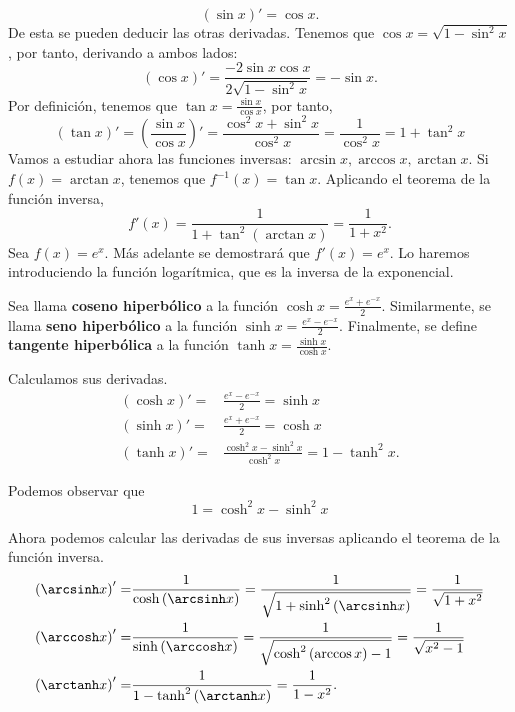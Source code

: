 \[ \left(\sin x\right)' = \cos x .\]
De esta se pueden deducir las otras derivadas. Tenemos que $\displaystyle \cos x= \sqrt{1 - \sin ^{2}x} $, por tanto, derivando a ambos lados:
\[\left(\cos x\right)' = \frac{-2\sin x\cos x}{2\sqrt{1 - \sin ^{2}x}} = - \sin x.\]
Por definición, tenemos que $\displaystyle \tan x= \frac{\sin x}{\cos x} $, por tanto,
\[\left(\tan x\right)' = \left(\frac{\sin x}{\cos x}\right)' = \frac{ \cos^{2} x + \sin ^{2} x }{\cos^{2}x} = \frac{1}{\cos^{2} x} = 1 + \tan ^{2} x\]
Vamos a estudiar ahora las funciones inversas: $\displaystyle \arcsin x, \arccos x, \arctan x $. Si $\displaystyle f\left(x\right) = \arctan x $, tenemos que $\displaystyle f^{-1}\left(x\right) = \tan x $. Aplicando el teorema de la función inversa,
\[f'\left(x\right) = \frac{1}{1 + \tan^{2}\left(\arctan x\right)} = \frac{1}{1 + x^{2}} .\]
Sea $\displaystyle f\left(x\right) = e^{x} $. Más adelante se demostrará que $\displaystyle f'\left(x\right) = e^{x} $. Lo haremos introduciendo la función logarítmica, que es la inversa de la exponencial.
\begin{fdefinition}
\normalfont Sea llama \textbf{coseno hiperbólico} a la función $\displaystyle \cosh x = \frac{e^{x}+e^{-x}}{2} $. Similarmente, se llama \textbf{seno hiperbólico} a la función $\displaystyle \sinh x = \frac{e^{x}-e^{-x}}{2} $. Finalmente, se define \textbf{tangente hiperbólica} a la función $\displaystyle \tanh x = \frac{\sinh x}{\cosh x} $.
\end{fdefinition}
Calculamos sus derivadas.
\[
\begin{split}
	\left(\cosh x\right)' = & \frac{e^{x}-e^{-x}}{2} = \sinh x \\
	\left(\sinh x\right)' = & \frac{e^{x}+e^{-x}}{2} = \cosh x \\
	\left(\tanh x\right)' = & \frac{\cosh^{2}x - \sinh^{2}x}{\cosh ^{2}x} = 1 - \tanh^{2}x.
\end{split}
\]
\begin{observation}
\normalfont Podemos observar que 
\[ \boxed{1 = \cosh^{2}x - \sinh^{2}x} \]
\end{observation}
Ahora podemos calcular las derivadas de sus inversas aplicando el teorema de la función inversa.
\[
\begin{split}
	\left(\arcsinh x\right)' = & \frac{1}{\cosh\left(\arcsinh x\right)} = \frac{1}{\sqrt{1 + \sinh^{2}\left(\arcsinh x\right)}} = \frac{1}{\sqrt{1+x^{2}}} \\
	\left(\arccosh x\right)' = & \frac{1}{\sinh\left(\arccosh x\right)} = \frac{1}{\sqrt{\cosh^{2}\left(\arccos x\right) - 1}} = \frac{1}{\sqrt{x^{2}-1}}\\
	\left(\arctanh x\right)' = & \frac{1}{1 - \tanh^{2}\left(\arctanh x\right)} = \frac{1}{1 - x^{2}}.
\end{split}
\]
